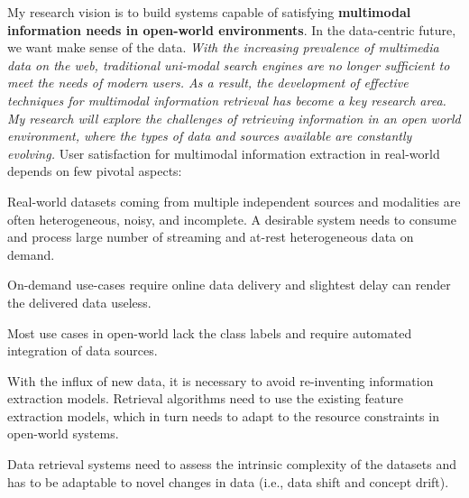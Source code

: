 \documentclass[9pt]{article}
\begin{document}
My research vision is to build systems capable of satisfying \textbf{multimodal information needs in open-world environments}. In the data-centric future, we want make sense of the data.
\textit{With the increasing prevalence of multimedia data on the web, traditional uni-modal search engines are no longer sufficient to meet the needs of modern users. As a result, the development of effective techniques for multimodal information retrieval has become a key research area.
My research will explore the challenges of retrieving information in an open world environment, where the types of data and sources available are constantly evolving.}
User satisfaction for multimodal information extraction in real-world depends on few pivotal aspects:
\begin{enumerate*}[label=(\roman*)]
    \item Real-world datasets coming from multiple independent sources and modalities are often heterogeneous, noisy, and incomplete. %
    A desirable system needs to consume and process large number of streaming and at-rest heterogeneous data on demand.
    \item 
    On-demand use-cases require online data delivery and slightest delay can render the delivered data useless.
    \item Most use cases in open-world lack the class labels and require automated integration of data sources. %
    \item With the influx of new data, it is necessary to avoid re-inventing information extraction models. Retrieval algorithms need to use the existing feature extraction models, which in turn needs to adapt to the resource constraints in open-world systems.
    \item Data retrieval systems need to assess  the intrinsic complexity of the datasets and has to be adaptable to novel changes in data (i.e., data shift and concept drift).
\end{enumerate*}
\end{document}
